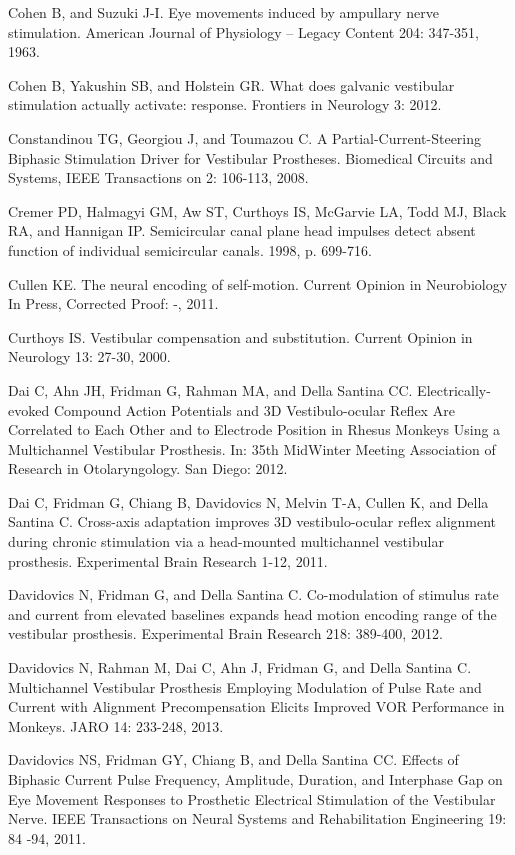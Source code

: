 {Cohen B, and Suzuki J-I. Eye movements induced by ampullary nerve stimulation. American Journal of Physiology -- Legacy Content 204: 347-351, 1963.

Cohen B, Yakushin SB, and Holstein GR. What does galvanic vestibular stimulation actually activate: response. Frontiers in Neurology 3: 2012.

Constandinou TG, Georgiou J, and Toumazou C. A Partial-Current-Steering Biphasic Stimulation Driver for Vestibular Prostheses. Biomedical Circuits and Systems, IEEE Transactions on 2: 106-113, 2008.

Cremer PD, Halmagyi GM, Aw ST, Curthoys IS, McGarvie LA, Todd MJ, Black RA, and Hannigan IP. Semicircular canal plane head impulses detect absent function of individual semicircular canals. 1998, p. 699-716.

Cullen KE. The neural encoding of self-motion. Current Opinion in Neurobiology In Press, Corrected Proof: -, 2011.

Curthoys IS. Vestibular compensation and substitution. Current Opinion in Neurology 13: 27-30, 2000.

Dai C, Ahn JH, Fridman G, Rahman MA, and Della Santina CC. Electrically-evoked Compound Action Potentials and 3D Vestibulo-ocular Reflex Are Correlated to Each Other and to Electrode Position in Rhesus Monkeys Using a Multichannel Vestibular Prosthesis. In: 35th MidWinter Meeting Association of Research in Otolaryngology. San Diego: 2012.

Dai C, Fridman G, Chiang B, Davidovics N, Melvin T-A, Cullen K, and Della Santina C. Cross-axis adaptation improves 3D vestibulo-ocular reflex alignment during chronic stimulation via a head-mounted multichannel vestibular prosthesis. Experimental Brain Research 1-12, 2011.

Davidovics N, Fridman G, and Della Santina C. Co-modulation of stimulus rate and current from elevated baselines expands head motion encoding range of the vestibular prosthesis. Experimental Brain Research 218: 389-400, 2012.

Davidovics N, Rahman M, Dai C, Ahn J, Fridman G, and Della Santina C. Multichannel Vestibular Prosthesis Employing Modulation of Pulse Rate and Current with Alignment Precompensation Elicits Improved VOR Performance in Monkeys. JARO 14: 233-248, 2013.

Davidovics NS, Fridman GY, Chiang B, and Della Santina CC. Effects of Biphasic Current Pulse Frequency, Amplitude, Duration, and Interphase Gap on Eye Movement Responses to Prosthetic Electrical Stimulation of the Vestibular Nerve. IEEE Transactions on Neural Systems and Rehabilitation Engineering 19: 84 -94, 2011.

}
